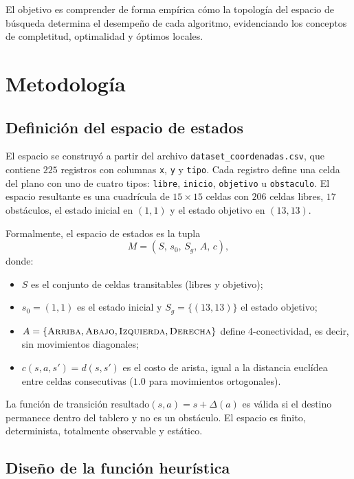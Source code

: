 \documentclass[12pt,a4paper]{article}
\newcommand{\code}[1]{\texttt{#1}}
\begin{document}
El objetivo es comprender de forma emp\'irica c\'omo la topolog\'ia del espacio de
b\'usqueda determina el desempe\~no de cada algoritmo, evidenciando los conceptos de
completitud, optimalidad y \'optimos locales.

\section{Metodolog\'ia}
\label{sec:metodologia}

\subsection{Definici\'on del espacio de estados}
\label{sec:espacio}

El espacio se construy\'o a partir del archivo \code{dataset\_coordenadas.csv}, que
contiene $225$ registros con columnas \code{x}, \code{y} y \code{tipo}. Cada registro
define una celda del plano con uno de cuatro tipos: \code{libre}, \code{inicio},
\code{objetivo} u \code{obstaculo}. El espacio resultante es una cuadr\'icula de
$15\times15$ celdas con $206$ celdas libres, $17$ obst\'aculos, el estado inicial en
$(1,1)$ y el estado objetivo en $(13,13)$.

Formalmente, el espacio de estados es la tupla
\[
M = (S,\, s_0,\, S_g,\, A,\, c),
\]
donde:
\begin{itemize}
    \item $S$ es el conjunto de celdas transitables (libres y objetivo);
    \item $s_0 = (1,1)$ es el estado inicial y $S_g = \{(13,13)\}$ el estado objetivo;
    \item $A = \{\textsc{Arriba}, \textsc{Abajo}, \textsc{Izquierda}, \textsc{Derecha}\}$
          define 4-conectividad, es decir, sin movimientos diagonales;
    \item $c(s,a,s') = d(s,s')$ es el costo de arista, igual a la distancia eucl\'idea
          entre celdas consecutivas ($1.0$ para movimientos ortogonales).
\end{itemize}

La funci\'on de transici\'on $\text{resultado}(s,a)=s+\Delta(a)$ es v\'alida si el destino
permanece dentro del tablero y no es un obst\'aculo. El espacio es finito, determinista,
totalmente observable y est\'atico.

\subsection{Dise\~no de la funci\'on heur\'istica}
\label{sec:heuristica}
\end{document}
